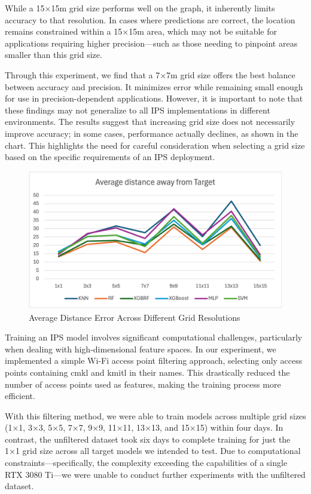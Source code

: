 \documentclass[conference]{IEEEtran}
\begin{document}
	While a 15×15m grid size performs well on the graph, it inherently limits accuracy to that resolution. In cases where predictions are correct, the location remains constrained within a 15×15m area, which may not be suitable for applications requiring higher precision—such as those needing to pinpoint areas smaller than this grid size.
	
	Through this experiment, we find that a 7×7m grid size offers the best balance between accuracy and precision. It minimizes error while remaining small enough for use in precision-dependent applications. However, it is important to note that these findings may not generalize to all IPS implementations in different environments. The results suggest that increasing grid size does not necessarily improve accuracy; in some cases, performance actually declines, as shown in the chart. This highlights the need for careful consideration when selecting a grid size based on the specific requirements of an IPS deployment.
	
	\begin{figure}[htbp]
		\centerline{\includegraphics[scale=0.65]{image2.png}}
		\caption{Average Distance Error Across Different Grid Resolutions}
		\label{fig3}
	\end{figure}
	
	Training an IPS model involves significant computational challenges, particularly when dealing with high-dimensional feature spaces. In our experiment, we implemented a simple Wi-Fi access point filtering approach, selecting only access points containing cmkl and kmitl in their names. This drastically reduced the number of access points used as features, making the training process more efficient.
	
	With this filtering method, we were able to train models across multiple grid sizes (1×1, 3×3, 5×5, 7×7, 9×9, 11×11, 13×13, and 15×15) within four days. In contrast, the unfiltered dataset took six days to complete training for just the 1×1 grid size across all target models we intended to test. Due to computational constraints—specifically, the complexity exceeding the capabilities of a single RTX 3080 Ti—we were unable to conduct further experiments with the unfiltered dataset.
	
\end{document}
